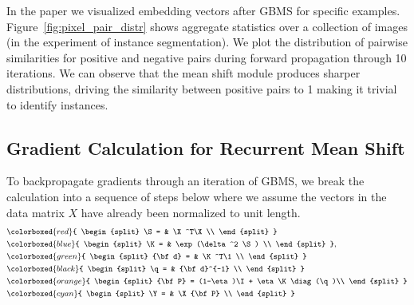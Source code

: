 In the paper we visualized embedding vectors after GBMS for specific
examples.  Figure~\ref{fig:pixel_pair_distr} shows aggregate statistics over a
collection of images (in the experiment of instance segmentation).
We plot the distribution of pairwise similarities for
positive and negative pairs during forward propagation through 10 iterations.
We can observe that the mean shift module produces sharper distributions,
driving the similarity between positive pairs to 1 making it trivial to
identify instances.

\subsection{Gradient Calculation for Recurrent Mean Shift}

To backpropagate gradients through an iteration of GBMS, we break the
calculation into a sequence of steps below where we assume the vectors
in the data matrix $X$ have already been normalized to unit length.
\begin{equation}\small
\begin{split}
&\colorboxed{red}{
\begin{split}
\S = & \X^T\X \\
\end{split}
}\\
&\colorboxed{blue}{
\begin{split}
\K = & \exp(\delta^2 \S) \\
\end{split}
}, \\
&\colorboxed{green}{
\begin{split}
{\bf d} = & \K^T\1 \\
\end{split}
}\\
& \colorboxed{black}{
\begin{split}
\q = & {\bf d}^{-1} \\
\end{split}
}\\
&\colorboxed{orange}{
\begin{split}
{\bf P} = (1-\eta)\I + \eta\K \diag(\q)\\
\end{split}
}\\
&\colorboxed{cyan}{
\begin{split}
\Y = & \X{\bf P} \\
\end{split}
}\\
\end{split}
\label{eq:GBMS_matrix_form}
\end{equation}
